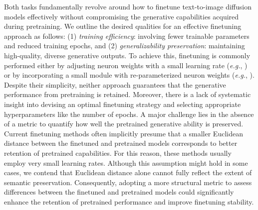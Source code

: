 Both tasks fundamentally revolve around how to finetune text-to-image diffusion models effectively without compromising the generative capabilities acquired during pretraining. We outline the desired qualities for an effective finetuning approach as follows: (1) \emph{training efficiency}: involving fewer trainable parameters and reduced training epochs, and (2) \emph{generalizability preservation}: maintaining high-quality, diverse generative outputs. To achieve this, finetuning is commonly performed either by adjusting neuron weights with a small learning rate (\emph{e.g.}, \cite{ruiz2023dreambooth}) or by incorporating a small module with re-parameterized neuron weights (\emph{e.g.}, \cite{hulora2022,zhang2023adding}). Despite their simplicity, neither approach guarantees that the generative performance from pretraining is retained. Moreover, there is a lack of systematic insight into devising an optimal finetuning strategy and selecting appropriate hyperparameters like the number of epochs. A major challenge lies in the absence of a metric to quantify how well the pretrained generative ability is preserved. Current finetuning methods often implicitly presume that a smaller Euclidean distance between the finetuned and pretrained models corresponds to better retention of pretrained capabilities. For this reason, these methods usually employ very small learning rates. Although this assumption might hold in some cases, we contend that Euclidean distance alone cannot fully reflect the extent of semantic preservation. Consequently, adopting a more structural metric to assess differences between the finetuned and pretrained models could significantly enhance the retention of pretrained performance and improve finetuning stability.

